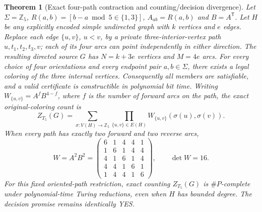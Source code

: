 \documentclass[11pt]{article}
\newtheorem{theorem}{Theorem}
\begin{document}
\begin{theorem}[Exact four-path contraction and counting/decision divergence]
Let \(\Sigma=\mathbb Z_5\), \(R(a,b)=[b-a\bmod 5\in\{1,3\}]\),
\(A_{ab}=R(a,b)\) and \(B=A^{\mathsf T}\).
Let \(H\) be any explicitly encoded simple undirected graph
with \(k\) vertices and \(e\) edges. Replace each edge
\(\{u,v\}\), \(u<v\), by a private three-interior-vertex path
\(u,t_1,t_2,t_3,v\); each of its four arcs can point independently
in either direction. The resulting directed source \(G\) has
\(N=k+3e\) vertices and \(M=4e\) arcs.
For every choice of four orientations and every endpoint pair
\(a,b\in\Sigma\), there exists a legal coloring of the three
internal vertices. Consequently all members are satisfiable,
and a valid certificate is constructible in polynomial bit time.
Writing \(W_{\{u,v\}}=A^fB^{4-f}\), where \(f\) is the number
of forward arcs on the path, the exact original-coloring count is
\[
  Z_{T_5}(G)=
  \sum_{\sigma:V(H)\to\mathbb Z_5}
  \prod_{\{u,v\}\in E(H)} W_{\{u,v\}}(\sigma(u),\sigma(v)).
\]
When every path has exactly two forward and two reverse arcs,
\[
W=A^2B^2=
\begin{pmatrix}
6&1&4&4&1\\1&6&1&4&4\\4&1&6&1&4\\
4&4&1&6&1\\1&4&4&1&6
\end{pmatrix},
\qquad\det W=16.
\]
For this fixed oriented-path restriction, exact counting
\(Z_{T_5}(G)\) is \(\#P\)-complete under polynomial-time Turing
reductions, even when \(H\) has bounded degree. The decision
promise remains identically YES.
\end{theorem}
\end{document}
